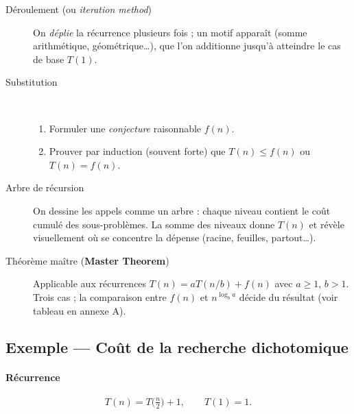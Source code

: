 \begin{description}
  \item[Déroulement (ou \textit{iteration method})]
        On \emph{déplie} la récurrence plusieurs fois ; un motif apparaît
        (somme arithmétique, géométrique…), que l’on additionne jusqu’à
        atteindre le cas de base \(T(1)\).

  \item[Substitution]\phantom{a}\\
        \begin{enumerate}
         \item Formuler une \emph{conjecture} raisonnable $f(n)$.
         \item Prouver par induction (souvent forte) que $T(n)\le f(n)$ ou
           $T(n)=f(n)$.
        \end{enumerate}


  \item[Arbre de récursion]
        On dessine les appels comme un arbre : chaque niveau contient le coût
        cumulé des sous-problèmes.  La somme des niveaux donne $T(n)$ et
        révèle visuellement où se concentre la dépense (racine, feuilles, partout…).

  \item[Théorème maître (\textbf{Master Theorem})]
        Applicable aux récurrences $T(n)=aT(n/b)+f(n)$ avec $a\ge1$, $b>1$.
        Trois cas ; la comparaison entre $f(n)$ et
        \(n^{\log_b a}\) décide du résultat (voir tableau en annexe A).
\end{description}

\subsection{Exemple — Coût de la recherche dichotomique}

\paragraph{Récurrence}
\[
T(n)=T\!\bigl(\tfrac{n}{2}\bigr)+1,\qquad T(1)=1.
\]

